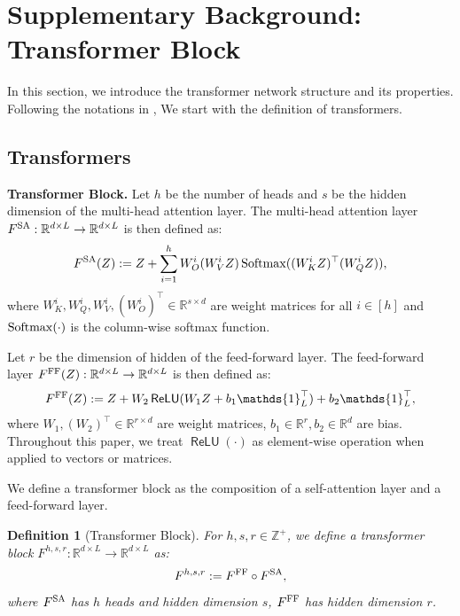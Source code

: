 \documentclass[12pt]{article}
\numberwithin{equation}{section}
\newcommand{\one}{\mathds{1}}
\newcommand{\Softmax}{\mathop{{\rm Softmax}}}
\newcommand{\ReLU}{\mathop{\mathsf{ReLU}}}
\def\R{\mathbb{R}}
\let\cite\citep
\theoremstyle{theoremstyle}
\newtheorem{definition}{Definition}[section]
\numberwithin{equation}{section}
\numberwithin{theorem}{section}
\numberwithin{proposition}{section}
\numberwithin{definition}{section}
\numberwithin{lemma}{section}
\numberwithin{assumption}{section}
\numberwithin{remark}{section}
\begin{document}




\section{Supplementary Background: Transformer Block}
\label{sec:transformers}
In this section, we introduce the transformer network structure \cite{vaswani2017attention} and its properties.
Following the notations in \cite{hu2024statistical},
We start with the definition of transformers.

\subsection{Transformers}
\textbf{Transformer Block.}
Let $h$ be the number of heads and $s$ be the hidden dimension of the multi-head attention layer.
The multi-head attention layer $F^{\rm SA}:\R^{d\times L}\to \R^{d\times L}$ is then defined as:
\begin{align*}
    F^{\rm SA}(Z):=Z+\sum_{i=1}^hW_O^i(W_V^iZ)\Softmax((W_K^iZ)^\top(W_Q^iZ)),
\end{align*}
where $W_K^i,W_Q^i,W_V^i,(W_O^i)^\top\in\R^{s\times d}$ are weight matrices for all $i\in[h]$ and $\Softmax(\cdot)$ is the column-wise softmax function.

Let $r$ be the dimension of hidden of the feed-forward layer. 
The feed-forward layer $F^{\rm FF}(Z):\R^{d\times L}\to \R^{d\times L}$ is then defined as:
\begin{align*}
    F^{\rm FF}(Z):=Z+W_2\ReLU(W_1Z+b_1\one_L^\top)+b_2\one_L^\top,
\end{align*}
where $W_1,(W_2)^\top\in\R^{r\times d}$ are weight matrices, $b_1\in\R^r,b_2\in\R^d$ are bias.
Throughout this paper, we treat $\ReLU(\cdot)$ as element-wise operation when applied to vectors or matrices.

We define a transformer block as  the composition of a self-attention layer and a feed-forward layer.
\begin{definition}[Transformer Block]\label{def:transformer_block}
For $h,s,r\in\mathbb{Z}^+$, we define a 
 transformer block $F^{h,s,r}:\R^{d\times L}\to \R^{d\times L}$ as:
\begin{align*}
    F^{h,s,r}:=F^{\rm FF}\circ F^{\rm SA},
\end{align*}
where $F^{\rm SA}$ has $h$ heads and hidden dimension $s$, $F^{\rm FF}$ has hidden dimension $r$.
\end{definition}
\end{document}
